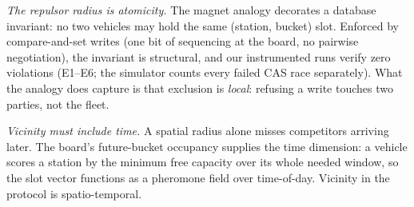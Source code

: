 \documentclass[twoside,twocolumn,usenatbib]{mnras}
\begin{document}
\emph{The repulsor radius is atomicity.}  The magnet analogy
decorates a database invariant: no two vehicles may hold the same
(station, bucket) slot.  Enforced by compare-and-set writes
(one bit of sequencing at the board, no pairwise negotiation), the
invariant is structural, and our instrumented runs verify zero
violations (E1--E6; the simulator counts every failed CAS race
separately).  What the analogy does capture is that exclusion is
\emph{local}: refusing a write touches two parties, not the fleet.

\emph{Vicinity must include time.}  A spatial radius alone misses
competitors arriving later.  The board's future-bucket occupancy
supplies the time dimension: a vehicle scores a station by the
minimum free capacity over its whole needed window, so the slot
vector functions as a pheromone field over time-of-day.  Vicinity in
the protocol is spatio-temporal.
\end{document}
